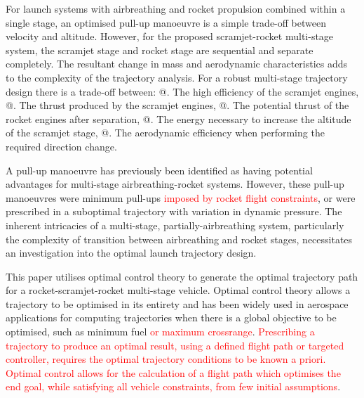 \documentclass[journal]{new-aiaa}
\makeatletter
\newcommand*{\rom}[1]{\expandafter\@slowromancap\romannumeral #1@}
\makeatother
\begin{document}
 For launch systems with airbreathing and rocket propulsion combined within a single stage, an optimised pull-up manoeuvre is a simple trade-off between velocity and altitude. However, for the proposed scramjet-rocket multi-stage system, the scramjet stage and rocket stage are sequential and separate completely.
 The resultant change in mass and aerodynamic characteristics adds to the complexity of the trajectory analysis.
 For a robust multi-stage trajectory design there is a trade-off between: 
 \rom{1}. The high efficiency of the scramjet engines,
\rom{2}. The thrust produced by the scramjet engines, 
\rom{3}. The potential thrust of the rocket engines after separation,
\rom{4}. The energy necessary to increase the altitude of the scramjet stage,
\rom{5}. The aerodynamic efficiency when performing the required direction change.


  A pull-up manoeuvre has previously been identified as having potential advantages for multi-stage airbreathing-rocket systems\cite{Tsuchiya2005,Wilhite1991,Mehta2001}. 
  However, these pull-up manoeuvres were minimum pull-ups \textcolor{red}{imposed by rocket flight constraints}\cite{Tsuchiya2005,Wilhite1991}, or were prescribed in a suboptimal trajectory with variation in dynamic pressure\cite{Mehta2001}. 
   The inherent intricacies of a multi-stage, partially-airbreathing system, particularly the complexity of transition between airbreathing and rocket stages, necessitates an investigation into the optimal launch trajectory design. 
  

   
   

This paper utilises optimal control theory to generate the optimal trajectory path for a rocket-scramjet-rocket multi-stage vehicle.
Optimal control theory allows a trajectory to be optimised in its entirety and has been widely used in aerospace applications for computing trajectories when there is a global objective to be optimised, such as minimum fuel\textcolor{red}{\cite{Bedrossian,Josselyn2002,Yang2017} or maximum crossrange\cite{Rizvi2015,Chai2015,Moshman2014}}. 
\textcolor{red}{Prescribing a trajectory to produce an optimal result, using a defined flight path or targeted controller, requires the optimal trajectory conditions to be known a priori. Optimal control allows for the calculation of a flight path which optimises the end goal, while satisfying all vehicle constraints, from few initial assumptions\cite{Rao2009}}.
\end{document}
